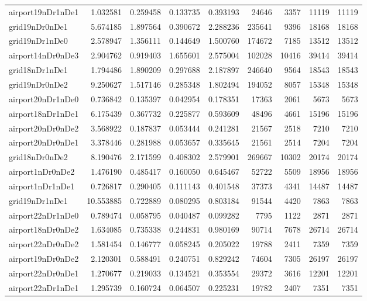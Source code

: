 \begin{longtable}{|l|r|r|r|r|r|r|r|r|}
airport19nDr1nDe1 & 1.032581 & 0.259458 & 0.133735 & 0.393193 & 24646 & 3357 & 11119 & 11119 \\
grid19nDr0nDe1 & 5.674185 & 1.897564 & 0.390672 & 2.288236 & 235641 & 9396 & 18168 & 18168 \\
grid19nDr1nDe0 & 2.578947 & 1.356111 & 0.144649 & 1.500760 & 174672 & 7185 & 13512 & 13512 \\
airport14nDr0nDe3 & 2.904762 & 0.919403 & 1.655601 & 2.575004 & 102028 & 10416 & 39414 & 39414 \\
grid18nDr1nDe1 & 1.794486 & 1.890209 & 0.297688 & 2.187897 & 246640 & 9564 & 18543 & 18543 \\
grid19nDr0nDe2 & 9.250627 & 1.517146 & 0.285348 & 1.802494 & 194052 & 8057 & 15348 & 15348 \\
airport20nDr1nDe0 & 0.736842 & 0.135397 & 0.042954 & 0.178351 & 17363 & 2061 & 5673 & 5673 \\
airport18nDr1nDe1 & 6.175439 & 0.367732 & 0.225877 & 0.593609 & 48496 & 4661 & 15196 & 15196 \\
airport20nDr0nDe2 & 3.568922 & 0.187837 & 0.053444 & 0.241281 & 21567 & 2518 & 7210 & 7210 \\
airport20nDr0nDe1 & 3.378446 & 0.281988 & 0.053657 & 0.335645 & 21561 & 2514 & 7204 & 7204 \\
grid18nDr0nDe2 & 8.190476 & 2.171599 & 0.408302 & 2.579901 & 269667 & 10302 & 20174 & 20174 \\
airport1nDr0nDe2 & 1.476190 & 0.485417 & 0.160050 & 0.645467 & 52722 & 5509 & 18956 & 18956 \\
airport1nDr1nDe1 & 0.726817 & 0.290405 & 0.111143 & 0.401548 & 37373 & 4341 & 14487 & 14487 \\
grid19nDr1nDe1 & 10.553885 & 0.722889 & 0.080295 & 0.803184 & 91544 & 4420 & 7863 & 7863 \\
airport22nDr1nDe0 & 0.789474 & 0.058795 & 0.040487 & 0.099282 & 7795 & 1122 & 2871 & 2871 \\
airport18nDr0nDe2 & 1.634085 & 0.735338 & 0.244831 & 0.980169 & 90714 & 7678 & 26714 & 26714 \\
airport22nDr0nDe2 & 1.581454 & 0.146777 & 0.058245 & 0.205022 & 19788 & 2411 & 7359 & 7359 \\
airport19nDr0nDe2 & 2.120301 & 0.588491 & 0.240751 & 0.829242 & 74604 & 7305 & 26197 & 26197 \\
airport22nDr0nDe1 & 1.270677 & 0.219033 & 0.134521 & 0.353554 & 29372 & 3616 & 12201 & 12201 \\
airport22nDr1nDe1 & 1.295739 & 0.160724 & 0.064507 & 0.225231 & 19782 & 2407 & 7351 & 7351 \\

\end{longtable}
